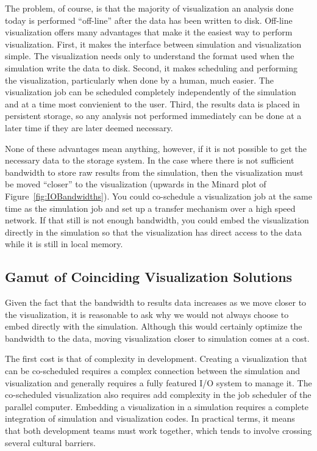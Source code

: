 \documentclass[conference]{IEEEtran}
\begin{document}
The problem, of course, is that the majority of visualization an analysis
done today is performed ``off-line'' after the data has been written to
disk.  Off-line visualization offers many advantages that make it the
easiest way to perform visualization.  First, it makes the interface
between simulation and visualization simple.  The visualization needs only
to understand the format used when the simulation write the data to disk.
Second, it makes scheduling and performing the visualization, particularly
when done by a human, much easier.  The visualization job can be scheduled
completely independently of the simulation and at a time most convienient
to the user.  Third, the results data is placed in persistent storage, so
any analysis not performed immediately can be done at a later time if they
are later deemed necessary.

None of these advantages mean anything, however, if it is not possible to
get the necessary data to the storage system.  In the case where there is
not sufficient bandwidth to store raw results from the simulation, then the
visualization must be moved ``closer'' to the visualization (upwards in the
Minard plot of Figure~\ref{fig:IOBandwidths}).  You could co-schedule a
visualization job at the same time as the simulation job and set up a
transfer mechanism over a high speed network.  If that still is not enough
bandwidth, you could embed the visualization directly in the simulation so
that the visualization has direct access to the data while it is still in
local memory.

\subsection{Gamut of Coinciding Visualization Solutions}

\noindent
Given the fact that the bandwidth to results data increases as we move
closer to the visualization, it is reasonable to ask why we would not
always choose to embed directly with the simulation.  Although this would
certainly optimize the bandwidth to the data, moving visualization closer
to simulation comes at a cost.

The first cost is that of complexity in development.  Creating a
visualization that can be co-scheduled requires a complex connection
between the simulation and visualization and generally requires a fully
featured I/O system to manage it.  The co-scheduled visualization also
requires add complexity in the job scheduler of the parallel computer.
Embedding a visualization in a simulation requires a complete integration
of simulation and visualization codes.  In practical terms, it means that
both development teams must work together, which tends to involve crossing
several cultural barriers.
\end{document}
